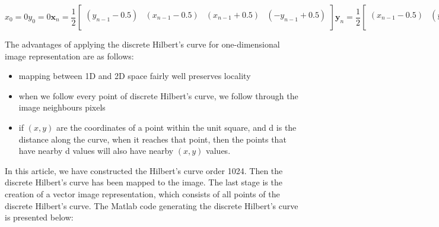 \documentclass[review,12pt]{elsarticle}
\begin{document}
{\begin{subequations} \label{subeqHilbert}

\begin{equation}
x_{0}=0
\label{subeqHilberta}
\end{equation}

\begin{equation}
y_{0}=0
\label{subeqHilbertb}
\end{equation}

\begin{equation}
\textbf{x}_{n}=\frac{1}{2}\left[
                   \begin{array}{cccc}
                     (y_{n-1}-0.5) & (x_{n-1}-0.5) & (x_{n-1}+0.5) & (-y_{n-1}+0.5) \\
                   \end{array}
                 \right]
\label{subeqHilbertc}
\end{equation}

\begin{equation}
\textbf{y}_{n}=\frac{1}{2}\left[
                   \begin{array}{cccc}
                     (x_{n-1}-0.5) & (y_{n-1}+0.5) & (y_{n-1}+0.5) & (-x_{n-1}-0.5) \\
                   \end{array}
                 \right]
\label{subeqHilbertc}
\end{equation}

\end{subequations}

The advantages of applying the discrete Hilbert's curve for one-dimensional image representation are as follows:
\begin{itemize}
\item mapping between 1D and 2D space fairly well preserves locality
\item when we follow every point of discrete Hilbert's curve, we follow through the image neighbours pixels
\item if $(x,y)$ are the coordinates of a point within the unit square,
and d is the distance along the curve, when it reaches that point, then the points that have nearby d values will also have nearby $(x,y)$ values.
\end{itemize}

In this article, we have constructed the Hilbert's curve order 1024. Then the discrete Hilbert's curve has been mapped to the image. The last stage is the creation of a vector image representation, which consists of all points of the discrete Hilbert's curve. The Matlab code generating the discrete Hilbert's curve is presented below:

}
\end{document}
